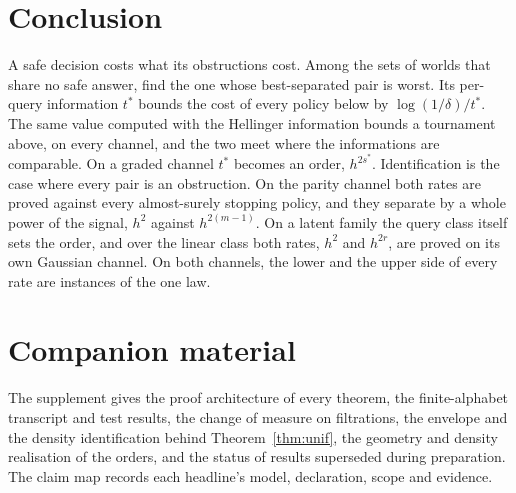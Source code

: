 \section{Conclusion}

A safe decision costs what its obstructions cost. Among the sets of worlds that share no safe
answer, find the one whose best-separated pair is worst. Its per-query information $t^{*}$
bounds the cost of every policy below by $\log(1/\delta)/t^{*}$. The same value computed with the
Hellinger information bounds a tournament above, on every channel, and the two meet where the
informations are comparable. On a graded channel $t^{*}$ becomes an order, $h^{2s^{*}}$. Identification is the case where every pair is an obstruction. On the parity
channel both rates are proved against every almost-surely stopping policy, and they separate
by a whole power of the signal, $h^{2}$ against $h^{2(m-1)}$. On a latent family the query
class itself sets the order, and over the linear class both rates, $h^{2}$ and $h^{2r}$, are
proved on its own Gaussian channel. On both channels, the lower and the upper side of every rate
are instances of the one law.

\section*{Companion material}
The supplement gives the proof architecture of every theorem, the finite-alphabet transcript and
test results, the change of measure on filtrations, the envelope and the density identification
behind Theorem~\ref{thm:unif}, the geometry and density realisation of the orders, and the status
of results superseded during preparation. The claim map records each headline's model,
declaration, scope and evidence.

